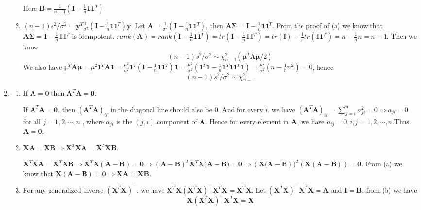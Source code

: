 \documentclass{article}
\begin{document}
\begin{enumerate}[leftmargin = 0 em, label = \arabic*., font = \bfseries]
\begin{enumerate}
Here $\bm B = \frac{1}{n-1} (\bm I - \frac{1}{n}\bm 1 \bm 1^T)$

\item 
$(n-1)s^2 / \sigma^2 = \bm y^T \frac{1}{\sigma^2} (\bm I - \frac{1}{n} \bm 1 \bm 1^T)\bm y$. Let $\bm A = \frac{1}{\sigma^2} (\bm I - \frac{1}{n} \bm 1 \bm 1^T)$, then $\bm A \bm \Sigma = \bm I - \frac{1}{n} \bm 1 \bm 1^T$. From the proof of (a) we know that $\bm A \bm \Sigma = \bm I - \frac{1}{n} \bm 1 \bm 1^T$ is idempotent. $rank(\bm A) = rank(\bm I - \frac{1}{n} \bm 1 \bm 1^T) = tr(\bm I - \frac{1}{n}\bm 1 \bm 1^T) = tr(\bm I) - \frac{1}{n}tr(\bm 1 \bm 1^T) = n - \frac{1}{n} n = n-1 $. Then we know 
\[(n-1)s^2 / \sigma^2 \sim \chi_{n-1}^2 (\bm \mu^T \bm A \bm \mu / 2)\]
We also have $\bm \mu^T\bm A \bm \mu = \mu^2 \bm 1^T \bm A \bm 1 = \frac{\mu^2}{\sigma^2}\bm 1^T(\bm I - \frac{1}{n} \bm 1 \bm 1^T)\bm 1 = \frac{\mu^2}{\sigma^2} (\bm 1^T \bm 1 - \frac{1}{n} \bm 1^T \bm 1 \bm 1^T \bm 1) = \frac{\mu^2}{\sigma^2} (n - \frac{1}{n} n^2) = 0$, hence
\[(n-1)s^2 / \sigma^2 \sim \chi_{n-1}^2 \]

\end{enumerate}
\item 
\begin{enumerate}
	\item 
	If $\bm A = \bm 0$ then $\bm A^T \bm A = \bm 0$.

	If $\bm A^T \bm A = \bm 0$, then $(\bm A^T \bm A)_{ii}$ in the diagonal line should also be 0.  And for every $i$, we have $(\bm A^T \bm A)_{ii} = \sum_{j = 1}^n a_{ji}^2 = 0 \Rightarrow a_{ji} = 0$ for all $j = 1, 2, \cdots, n$ , where $a_{ji}$ is the $(j,i)$ component of $\bm A$. Hence for every element in $\bm A$, we have $a_{ij} = 0, i,j = 1,2,\cdots, n$.Thus $\bm A = \bm 0$.

	\item 
	$\bm X\bm A = \bm X\bm B \Rightarrow \bm X^T \bm X \bm A = \bm X^T \bm X \bm B$.

	$\bm X^T \bm X \bm A = \bm X^T \bm X \bm B \Rightarrow \bm X^T \bm X(\bm A - \bm B) = \bm 0 \Rightarrow (\bm A - \bm B)^T \bm X^T \bm X \bm (\bm A - \bm B) = \bm 0 \Rightarrow (\bm X \bm (\bm A - \bm B))^T (\bm X(\bm A - \bm B)) = \bm 0$. From (a) we know that $\bm X(\bm A - \bm B) = \bm 0 \Rightarrow \bm X \bm A = \bm X \bm B$.
	\item 
	For any generalized inverse $(\bm X^T \bm X)^{-}$, we have $\bm X^T \bm X (\bm X^T \bm X)^{-} \bm X^T \bm X = \bm X^T \bm X$. Let $(\bm X^T \bm X)^{-} \bm X^T \bm X = \bm A$ and $\bm I = \bm B$, from (b) we have 
	\[\bm X (\bm X^T \bm X)^{-} \bm X^T \bm X = \bm X\]


\end{enumerate}
\end{enumerate}
\end{document}
